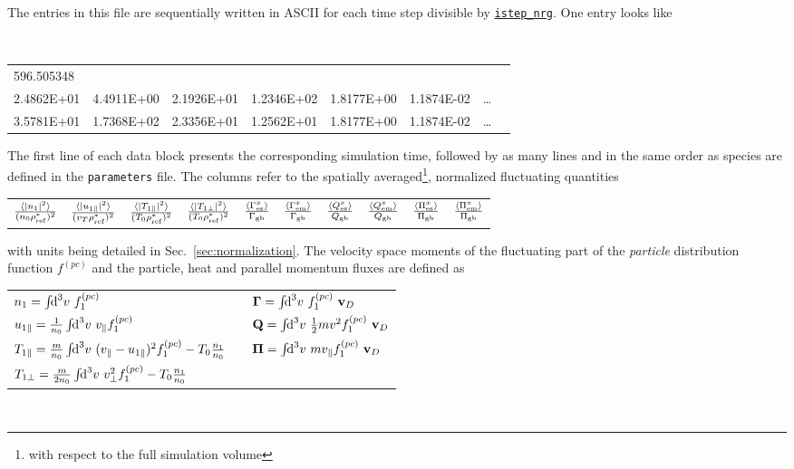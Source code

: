 \documentclass[12pt]{article}
\begin{document}
The entries in this file are sequentially written in ASCII for each time step divisible by
\hyperlink{istep_nrg}{\tt istep\_nrg}. One entry looks like
\begin{center}
\scriptsize \tt
\begin{tabular}{llllllll}
596.505348 & & & & & & &\\
2.4862E+01 & 4.4911E+00 & 2.1926E+01 & 1.2346E+02 & 1.8177E+00 & 1.1874E-02 & \ldots \\ %
3.5781E+01 & 1.7368E+02 & 2.3356E+01 & 1.2562E+01 & 1.8177E+00 & 1.1874E-02 & \ldots %
\end{tabular}
\end{center}
The first line of each data block presents the corresponding simulation time,
followed by as many lines and in the same order as species are defined in
the {\tt parameters} file. The columns refer to the spatially averaged\footnote{with respect to the full simulation
volume}, normalized fluctuating quantities\\[-5ex]
\begin{center}
\begin{tabular}{*{10}{c}} %
$\frac{\langle \left| n_1 \right|^2 \rangle}{(n_0\rho_{{\rm ref}}^*)^2}$ & $\frac{\langle |u_{1\parallel}|^2 \rangle}{(v_T \rho_{\rm ref}^*)^2}$ &
$\frac{{\langle |T_{1\parallel}|^2 \rangle}}{(T_0 \rho_{\rm ref}^*)^2}$ & $\frac{{\langle \left| T_{1\perp} \right|^2 \rangle}}{(T_0 \rho_{\rm ref}^*)^2}$ &
$\frac{\langle \Gamma_{\rm es}^x \rangle}{\Gamma_{\rm gb}}$ & $\frac{\langle \Gamma_{\rm em}^x \rangle}{\Gamma_{\rm gb}}$ &
$\frac{\langle Q_{\rm es}^x \rangle}{Q_{\rm gb}}$ & $\frac{\langle Q_{\rm em}^x \rangle}{Q_{\rm gb}}$ &
$\frac{\langle \Pi_{\rm es}^x \rangle}{\Pi_{\rm gb}}$ & $\frac{\langle \Pi_{\rm em}^x \rangle}{\Pi_{\rm gb}}$ \\
\end{tabular}
\end{center}
with units being detailed in Sec.~\ref{sec:normalization}.
The velocity space moments of the fluctuating part of the {\em particle} distribution function $f^{(pc)}$ and the
particle, heat and parallel momentum fluxes are defined as\\[1ex]
\begin{tabular}{lp{3em}l}
$n_{1} = \int\!\!\text{d}^3v\,\, f_1^{(pc)}$                     & & $\mathbf{\Gamma} = \int\!\!\text{d}^3v\,\, f_1^{(pc)}\,\, \mathbf{v}_D$ \\
$u_{1\|} = \frac{1}{n_0} \int\!\!\text{d}^3v\,\,v_\| f_1^{(pc)}$ & & $\mathbf{Q} = \int\!\!\text{d}^3v\,\, \frac{1}{2}m v^2 f_1^{(pc)}\,\, \mathbf{v}_D$ \\
$T_{1\|} = \frac{m}{n_{0}} \int\!\!\text{d}^3v\,\,(v_\|-u_{1\|})^2 f_1^{(pc)} - T_{0} \frac{n_{1}}{n_{0}}$ & &
$\mathbf{\Pi} = \int\!\!\text{d}^3v\,\, m v_{\|} f_1^{(pc)}\,\, \mathbf{v}_D$ \\
$T_{1\perp} = \frac{m}{2n_{0}} \int\!\!\text{d}^3v\,\,v_\perp^2 f_1^{(pc)} - T_{0} \frac{n_{1}}{n_0}$ & \\
\end{tabular}\\[1ex]
\end{document}
